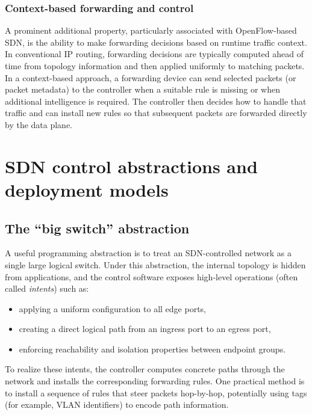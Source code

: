 \documentclass[11pt,a4paper,openany]{report}
\begin{document}
\subsubsection*{Context-based forwarding and control}

A prominent additional property, particularly associated with OpenFlow-based SDN, is the ability to make forwarding decisions based on runtime traffic context. In conventional IP routing, forwarding decisions are typically computed ahead of time from topology information and then applied uniformly to matching packets. In a context-based approach, a forwarding device can send selected packets (or packet metadata) to the controller when a suitable rule is missing or when additional intelligence is required. The controller then decides how to handle that traffic and can install new rules so that subsequent packets are forwarded directly by the data plane.

\section{SDN control abstractions and deployment models}

\subsection{The ``big switch'' abstraction}

A useful programming abstraction is to treat an SDN-controlled network as a single large logical switch. Under this abstraction, the internal topology is hidden from applications, and the control software exposes high-level operations (often called \emph{intents}) such as:

\begin{itemize}
\item applying a uniform configuration to all edge ports,
\item creating a direct logical path from an ingress port to an egress port,
\item enforcing reachability and isolation properties between endpoint groups.
\end{itemize}

To realize these intents, the controller computes concrete paths through the network and installs the corresponding forwarding rules. One practical method is to install a sequence of rules that steer packets hop-by-hop, potentially using tags (for example, VLAN identifiers) to encode path information.
\end{document}
